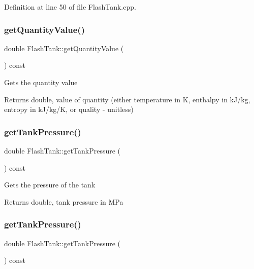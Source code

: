Definition at line 50 of file Flash\+Tank.\+cpp.

\mbox{\label{class_flash_tank_ab2145598969881df58736a1b65326d17}} 
\subsubsection{\texorpdfstring{get\+Quantity\+Value()}{getQuantityValue()}\hspace{0.1cm}{\footnotesize\ttfamily [3/3]}}
{\footnotesize\ttfamily double Flash\+Tank\+::get\+Quantity\+Value (\begin{DoxyParamCaption}{ }\end{DoxyParamCaption}) const}

Gets the quantity value \begin{DoxyReturn}{Returns}
double, value of quantity (either temperature in K, enthalpy in k\+J/kg, entropy in k\+J/kg/K, or quality -\/ unitless) 
\end{DoxyReturn}
\mbox{\label{class_flash_tank_af5d4f0bf7babe61120e1e4452594e1af}} 
\subsubsection{\texorpdfstring{get\+Tank\+Pressure()}{getTankPressure()}\hspace{0.1cm}{\footnotesize\ttfamily [1/3]}}
{\footnotesize\ttfamily double Flash\+Tank\+::get\+Tank\+Pressure (\begin{DoxyParamCaption}{ }\end{DoxyParamCaption}) const}

Gets the pressure of the tank \begin{DoxyReturn}{Returns}
double, tank pressure in M\+Pa 
\end{DoxyReturn}
\mbox{\label{class_flash_tank_af5d4f0bf7babe61120e1e4452594e1af}} 
\subsubsection{\texorpdfstring{get\+Tank\+Pressure()}{getTankPressure()}\hspace{0.1cm}{\footnotesize\ttfamily [2/3]}}
{\footnotesize\ttfamily double Flash\+Tank\+::get\+Tank\+Pressure (\begin{DoxyParamCaption}{ }\end{DoxyParamCaption}) const}

